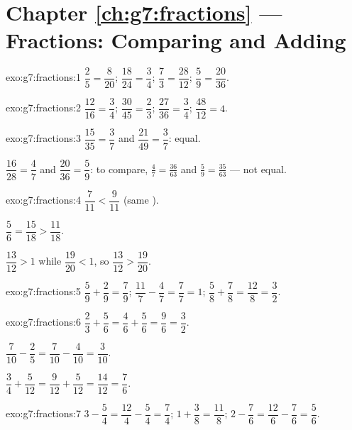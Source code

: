 \section*{Chapter \ref{ch:g7:fractions} --- Fractions: Comparing and Adding}

\begin{solution}{exo:g7:fractions:1}
$\dfrac{2}{5} = \dfrac{8}{20}$; \quad
$\dfrac{18}{24} = \dfrac{3}{4}$; \quad
$\dfrac{7}{3} = \dfrac{28}{12}$; \quad
$\dfrac{5}{9} = \dfrac{20}{36}$.
\end{solution}

\begin{solution}{exo:g7:fractions:2}
$\dfrac{12}{16} = \dfrac34$; \quad
$\dfrac{30}{45} = \dfrac23$; \quad
$\dfrac{27}{36} = \dfrac34$; \quad
$\dfrac{48}{12} = 4$.
\end{solution}

\begin{solution}{exo:g7:fractions:3}
$\dfrac{15}{35} = \dfrac37$ and $\dfrac{21}{49} = \dfrac37$: equal.

$\dfrac{16}{28} = \dfrac47$ and $\dfrac{20}{36} = \dfrac59$: to
compare, $\frac47 = \frac{36}{63}$ and $\frac59 = \frac{35}{63}$ ---
not equal.
\end{solution}

\begin{solution}{exo:g7:fractions:4}
$\dfrac{7}{11} < \dfrac{9}{11}$ (same ).

$\dfrac56 = \dfrac{15}{18} > \dfrac{11}{18}$.

$\dfrac{13}{12} > 1$ while $\dfrac{19}{20} < 1$, so
$\dfrac{13}{12} > \dfrac{19}{20}$.
\end{solution}

\begin{solution}{exo:g7:fractions:5}
$\dfrac59 + \dfrac29 = \dfrac79$; \quad
$\dfrac{11}{7} - \dfrac47 = \dfrac77 = 1$; \quad
$\dfrac58 + \dfrac78 = \dfrac{12}{8} = \dfrac32$.
\end{solution}

\begin{solution}{exo:g7:fractions:6}
$\dfrac23 + \dfrac56 = \dfrac46 + \dfrac56 = \dfrac96 = \dfrac32$.

$\dfrac{7}{10} - \dfrac25 = \dfrac{7}{10} - \dfrac{4}{10} =
\dfrac{3}{10}$.

$\dfrac34 + \dfrac{5}{12} = \dfrac{9}{12} + \dfrac{5}{12} =
\dfrac{14}{12} = \dfrac76$.
\end{solution}

\begin{solution}{exo:g7:fractions:7}
$3 - \dfrac54 = \dfrac{12}{4} - \dfrac54 = \dfrac74$; \quad
$1 + \dfrac38 = \dfrac{11}{8}$; \quad
$2 - \dfrac76 = \dfrac{12}{6} - \dfrac76 = \dfrac56$.
\end{solution}

